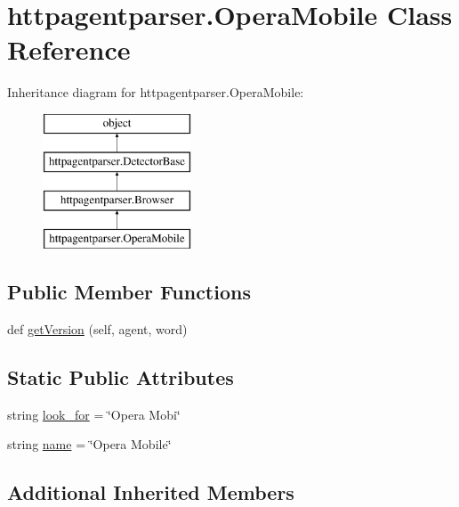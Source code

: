 \hypertarget{classhttpagentparser_1_1_opera_mobile}{}\section{httpagentparser.\+Opera\+Mobile Class Reference}
\label{classhttpagentparser_1_1_opera_mobile}
Inheritance diagram for httpagentparser.\+Opera\+Mobile\+:\begin{figure}[H]
\begin{center}
\leavevmode
\includegraphics[height=4.000000cm]{classhttpagentparser_1_1_opera_mobile}
\end{center}
\end{figure}
\subsection*{Public Member Functions}
\begin{DoxyCompactItemize}
\item 
def \hyperlink{classhttpagentparser_1_1_opera_mobile_af8c3ca76ea902b29043486473144fd18}{get\+Version} (self, agent, word)
\end{DoxyCompactItemize}
\subsection*{Static Public Attributes}
\begin{DoxyCompactItemize}
\item 
string \hyperlink{classhttpagentparser_1_1_opera_mobile_ae2403fee29098da6edf99f96614542b2}{look\+\_\+for} = \char`\"{}Opera Mobi\char`\"{}
\item 
string \hyperlink{classhttpagentparser_1_1_opera_mobile_aa26af89c14f81998311f93f8556b33ce}{name} = \char`\"{}Opera Mobile\char`\"{}
\end{DoxyCompactItemize}
\subsection*{Additional Inherited Members}


